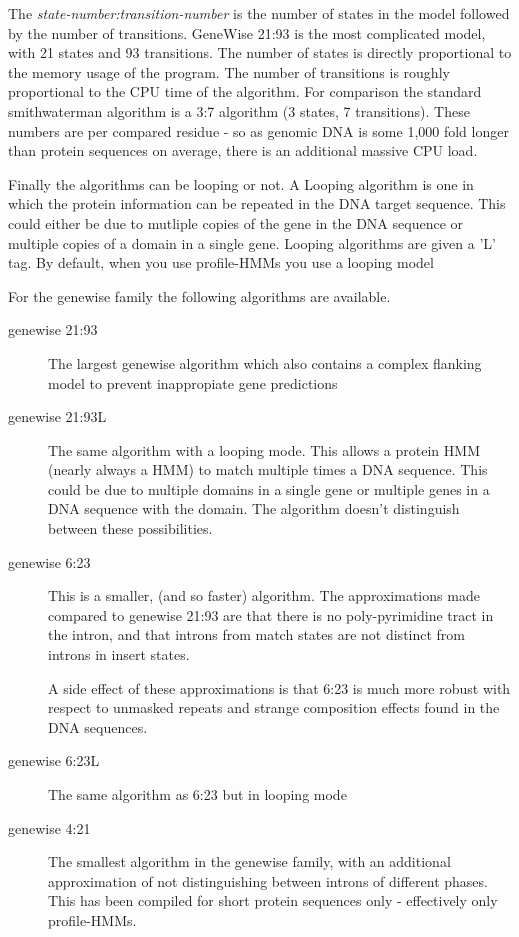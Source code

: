 \documentclass{article}
\begin{document}
The \emph{state-number:transition-number} is the number of states in the model
followed by the number of transitions. GeneWise 21:93 is the most complicated
model, with 21 states and 93 transitions. The number of states is directly
proportional to the memory usage of the program. The number of transitions
is roughly proportional to the CPU time of the algorithm. For comparison the
standard smithwaterman algorithm is a 3:7 algorithm (3 states, 7 transitions).
These numbers are per compared residue - so as genomic DNA is some 1,000 fold
longer than protein sequences on average, there is an additional massive 
CPU load.

Finally the algorithms can be looping or not. A Looping algorithm is one in
which the protein information can be repeated in the DNA target sequence.
This could either be due to mutliple copies of the gene in the DNA sequence
or multiple copies of a domain in a single gene. Looping algorithms are
given a 'L' tag. By default, when you use profile-HMMs you use a looping model

For the genewise family the following algorithms are available.
\begin{description}
\item[genewise 21:93] The largest genewise algorithm which also contains
a complex flanking model to prevent inappropiate gene predictions
\item[genewise 21:93L] The same algorithm with a looping mode. This allows
a protein HMM (nearly always a HMM) to match multiple times a DNA sequence.
This could be due to multiple domains in a single gene or multiple genes
in a DNA sequence with the domain. The algorithm doesn't distinguish between
these possibilities.
\item[genewise 6:23] This is a smaller, (and so faster) algorithm. The
approximations made compared to genewise 21:93 are that there is no
poly-pyrimidine tract in the intron, and that introns from match states
are not distinct from introns in insert states. 

A side effect of these approximations is that 6:23 is much more robust
with respect to unmasked repeats and strange composition effects found
in the DNA sequences.
\item[genewise 6:23L] The same algorithm as 6:23 but in looping mode
\item[genewise 4:21] The smallest algorithm in the genewise family,
with an additional approximation of not distinguishing between introns
of different phases. This has been compiled for short protein sequences
only - effectively only profile-HMMs.
\end{description}
\end{document}
